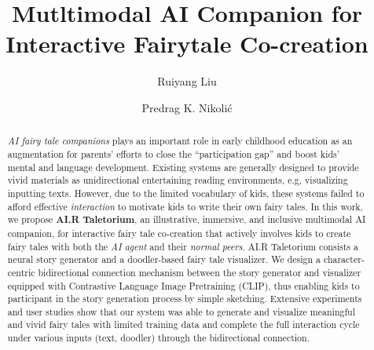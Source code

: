 \documentclass[sigconf,authorversion]{acmart}
\begin{document}
\fancyhead{}


\title{Mutltimodal AI Companion for Interactive Fairytale Co-creation}


\author{Ruiyang Liu}

\author{Predrag K. Nikolić}



\begin{abstract}
\textit{AI fairy tale companions} plays an important role in early childhood education as an augmentation for parents' efforts to close the ``participation gap'' and boost kids' mental and language development. 
Existing systems are generally designed to provide vivid materials as unidirectional entertaining reading environments, e.g, visualizing inputting texts.
However, due to the limited vocabulary of kids, these systems failed to afford effective \textit{interaction} to motivate kids to write their own fairy tales.
In this work, we propose \textbf{AI.R Taletorium}, an illustrative, immersive, and inclusive multimodal AI companion, for interactive fairy tale co-creation that actively involves kids to create fairy tales with both the \textit{AI agent} and their \textit{normal peers}. 
AI.R Taletorium consists a neural story generator and a doodler-based fairy tale visualizer. We design a character-centric bidirectional connection mechanism between the story generator and visualizer equipped with Contrastive Language Image Pretraining (CLIP), thus enabling kids to participant in the story generation process by simple sketching. 
Extensive experiments and user studies show that our system was able to generate and visualize meaningful and vivid fairy tales with limited training data and complete the full interaction cycle under various inputs (text, doodler) through the bidirectional connection.
\end{abstract}
\end{document}
